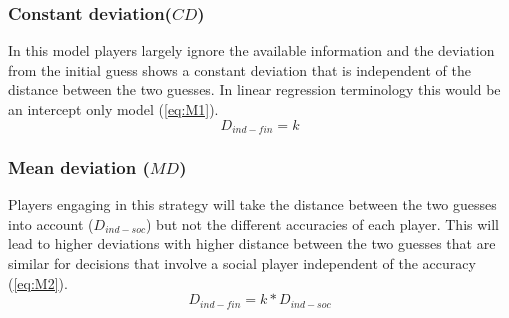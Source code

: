 \documentclass[jou]{apa}
\begin{document}
\subsubsection{Constant deviation($CD$)} In this model players largely ignore the available information and the deviation from the initial guess shows a constant deviation that is independent of the distance between the two guesses. In linear regression terminology this would be an intercept only model (\ref{eq:M1}).
\begin{equation}
D_{ind-fin}=k
\label{eq:M1}
\end{equation}
\subsubsection{Mean deviation ($MD$)} Players engaging in this strategy will take the distance between the two guesses into account ($D_{ind-soc}$) but not the different accuracies of each player. This will lead to higher deviations with higher distance between the two guesses that are similar for decisions that involve a social player independent of the accuracy (\ref{eq:M2}).
\begin{equation}
D_{ind-fin}=k*D_{ind-soc}
\label{eq:M2}
\end{equation}
\end{document}
